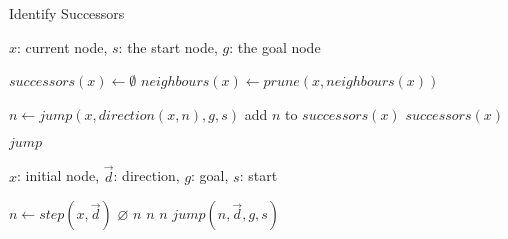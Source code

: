 \begin{algorithm}[b]
\caption{Identify Successors}
\label{alg:successors}
\begin{algorithmic}[1]
\REQUIRE $x$: current node, $s$: the start node, $g$: the goal node

\STATE $successors(x) \leftarrow \emptyset$
\STATE $neighbours(x) \leftarrow prune(x, neighbours(x))$ 

\STATE $n \leftarrow jump(x, direction(x, n), g, s)$
\STATE add $n$ to $successors(x)$
\ENDFOR
\RETURN $successors(x)$

\end{algorithmic}
\end{algorithm}

\begin{algorithm}[b]
\caption{$jump$}
\label{alg:jump}
\begin{algorithmic}[1]
\REQUIRE $x$: initial node, $\vec{d}$: direction, $g$: goal, $s$: start

\STATE $n \leftarrow step(x, \vec{d})$
	\RETURN $\varnothing$
\ENDIF
{}
	\RETURN $n$
\ENDIF
{}
	\RETURN $n$
\ENDIF
{}
			\RETURN $n$
		\ENDIF
	\ENDFOR
\ENDIF
\RETURN $jump(n, \vec{d}, g, s)$
\end{algorithmic}
\end{algorithm}
